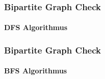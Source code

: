 \begin{frame}
	\frametitle{Bipartite Graph Check}
	\framesubtitle{DFS Algorithmus}
	
\end{frame}

\begin{frame}
	\frametitle{Bipartite Graph Check}
	\framesubtitle{BFS Algorithmus}
		
\end{frame}